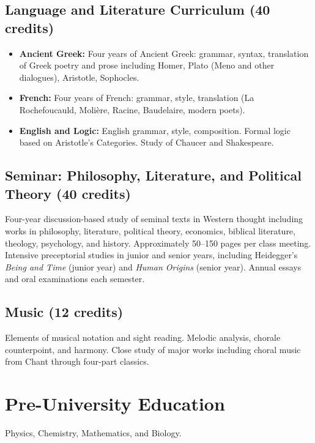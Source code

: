 \documentclass[11pt]{article}
\begin{document}
\subsection{Language and Literature Curriculum \mdseries(40 credits)}
\begin{itemize}[noitemsep, topsep=0pt]
    \item \textbf{Ancient Greek:} Four years of Ancient Greek: grammar, syntax, translation of Greek poetry and prose including Homer, Plato (Meno and other dialogues), Aristotle, Sophocles.
    \item \textbf{French:} Four years of French: grammar, style, translation (La Rochefoucauld, Molière, Racine, Baudelaire, modern poets).
    \item \textbf{English and Logic:} English grammar, style, composition. Formal logic based on Aristotle's Categories. Study of Chaucer and Shakespeare.
\end{itemize}

\subsection{Seminar: Philosophy, Literature, and Political Theory \mdseries(40 credits)}
Four-year discussion-based study of seminal texts in Western thought including works in philosophy, literature, political theory, economics, biblical literature, theology, psychology, and history. Approximately 50--150 pages per class meeting. Intensive preceptorial studies in junior and senior years, including Heidegger's \textit{Being and Time} (junior year) and \textit{Human Origins} (senior year). Annual essays and oral examinations each semester.

\subsection{Music \mdseries(12 credits)}
Elements of musical notation and sight reading. Melodic analysis, chorale counterpoint, and harmony. Close study of major works including choral music from Chant through four-part classics.

\section{Pre-University Education}
Physics, Chemistry, Mathematics, and Biology.
\end{document}
